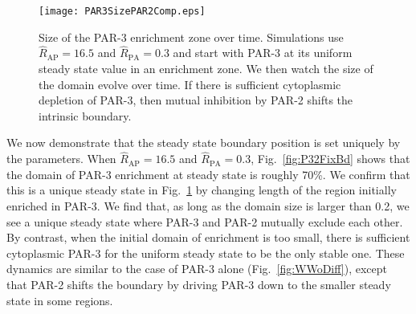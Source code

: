 \documentclass[11pt]{article}
\newcommand{\6}[1]{#1_{\text{6}}}
\newcommand{\3}[1]{#1_{\text{3}}}
\begin{document}
\begin{figure}
\centering
\texttt{[image: PAR3SizePAR2Comp.eps]}
\caption{\label{fig:P32FixBdEq}Size of the PAR-3 enrichment zone over time. Simulations use $\hat R_\text{AP}=16.5$ and $\hat R_\text{PA}=0.3$ and start with PAR-3 at its uniform steady state value in an enrichment zone. We then watch the size of the domain evolve over time. If there is sufficient cytoplasmic depletion of PAR-3, then mutual inhibition by PAR-2 shifts the intrinsic boundary.}
\end{figure}

We now demonstrate that the steady state boundary position is set uniquely by the parameters. When $\hat R_\text{AP}=16.5$ and $\hat R_\text{PA}=0.3$, Fig.\ \ref{fig:P32FixBd} shows that the domain of PAR-3 enrichment at steady state is roughly 70\%. We confirm that this is a unique steady state in Fig.\ \ref{fig:P32FixBdEq} by changing length of the region initially enriched in PAR-3. We find that, as long as the domain size is larger than 0.2, we see a unique steady state where PAR-3 and PAR-2 mutually exclude each other. By contrast, when the initial domain of enrichment is too small, there is sufficient cytoplasmic PAR-3 for the uniform steady state to be the only stable one. These dynamics are similar to the case of PAR-3 alone (Fig.\ \ref{fig:WWoDiff}), except that PAR-2 shifts the boundary by driving PAR-3 down to the smaller steady state in some regions.
\end{document}
